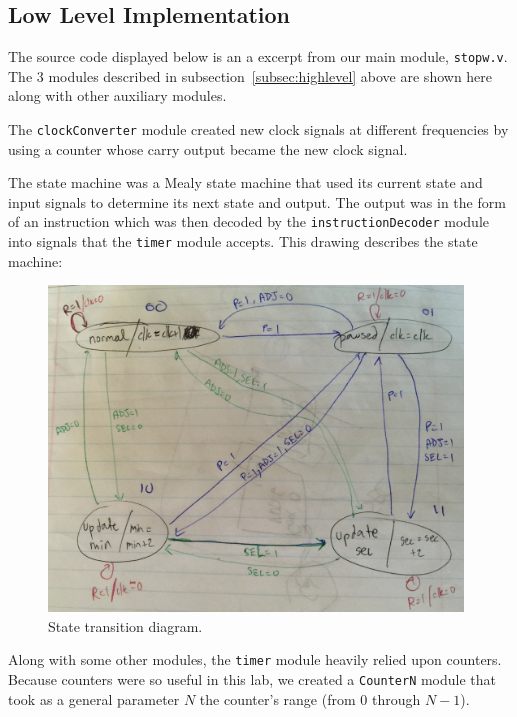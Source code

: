 \documentclass[]{article}
\begin{document}
\subsection{Low Level Implementation}

The source code displayed below is an a excerpt from our main module, \texttt{stopw.v}. The 3 modules described in subsection~\ref{subsec:highlevel} above are shown here along with other auxiliary modules.



The \texttt{clockConverter} module created new clock signals at different frequencies by using a counter whose carry output became the new clock signal.

The state machine was a Mealy state machine that used its current state and input signals to determine its next state and output. The output was in the form of an instruction which was then decoded by the \texttt{instructionDecoder} module into signals that the \texttt{timer} module accepts. This drawing describes the state machine:\\

\begin{figure}[H]
\centering
\includegraphics[width=11cm]{state_diagram.jpeg}
\caption{State transition diagram.}
\label{fig:state}
\end{figure}

Along with some other modules, the \texttt{timer} module heavily relied upon counters. Because counters were so useful in this lab, we created a \texttt{CounterN} module that took as a general parameter $N$ the counter's range (from $0$ through $N - 1$).


\end{document}
